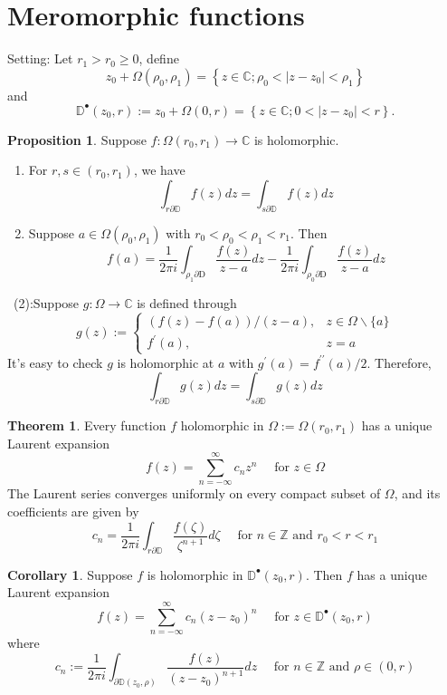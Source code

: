 \documentclass[12pt,a4paper]{book}
\newenvironment{prooff}{{\noindent\it\textcolor{cyan!40!black}{Proof}:}\,}{\par}
\newenvironment{enu}{\begin{enumerate}[(1)]}{\end{enumerate}}
\theoremstyle{definition}
\newtheorem{coro}[defn]{Corollary}
\newtheorem{theo}[defn]{Theorem}
\newtheorem{prop}[defn]{Proposition}
\begin{document}
\section{Meromorphic functions}
Setting: Let $r_1>r_0\ge 0$, define  
$$
z_0+\Omega\left(\rho_0, \rho_1\right)=\left\{z \in \mathbb{C} ; \rho_0<\left|z-z_0\right|<\rho_1\right\}
$$
and 
$$
\mathbb{D}^{\bullet}\left(z_0, r\right):=z_0+\Omega(0, r)=\left\{z \in \mathbb{C} ; 0<\left|z-z_0\right|<r\right\} .
$$

\begin{prop}
    Suppose $f: \Omega\left(r_0, r_1\right) \rightarrow \mathbb{C}$ is holomorphic.
\begin{enu} 
    \item For $r, s \in\left(r_0, r_1\right)$, we have
    $$
    \int_{r \partial \mathbb{D}} f(z) d z=\int_{s \partial \mathbb{D}} f(z) d z
    $$

    \item Suppose $a \in \Omega\left(\rho_0, \rho_1\right)$ with $r_0<\rho_0<\rho_1<r_1$. Then
    $$
    f(a)=\frac{1}{2 \pi i} \int_{\rho_1 \partial \mathrm{D}} \frac{f(z)}{z-a} d z-\frac{1}{2 \pi i} \int_{\rho_0 \partial \mathrm{D}} \frac{f(z)}{z-a} d z
    $$
\end{enu}
\end{prop}
\begin{prooff}
    (2):Suppose $g: \Omega \rightarrow \mathbb{C}$ is defined through
    $$
    g(z):=\left\{\begin{array}{cl}
    (f(z)-f(a)) /(z-a), & z \in \Omega \backslash\{a\} \\
    f^{\prime}(a), & z=a
    \end{array}\right.
    $$
    It's easy to check $g$ is holomorphic 
    at $a$ with $g^{\prime}(a)=f^{\prime \prime}(a) / 2$. Therefore, 
    $$
    \int_{r \partial \mathbb{D}} g(z) d z=\int_{s \partial \mathbb{D}} g(z) d z
    $$
\end{prooff}
\begin{theo}
    Every function $f$ holomorphic in $\Omega:=\Omega\left(r_0, r_1\right)$ has a unique Laurent expansion
    $$
    f(z)=\sum_{n=-\infty}^{\infty} c_n z^n \quad \text { for } z \in \Omega
    $$
    The Laurent series converges uniformly on every compact subset of $\Omega$, and its coefficients are given by
    $$
    c_n=\frac{1}{2 \pi i} \int_{r \partial \mathbb{D}} \frac{f(\zeta)}{\zeta^{n+1}} d \zeta \quad \text { for } n \in \mathbb{Z} \text { and } r_0<r<r_1
    $$
\end{theo}
\begin{coro}
    Suppose $f$ is holomorphic in $\mathbb{D}^{\bullet}\left(z_0, r\right)$. Then $f$ has a unique Laurent expansion
    $$
    f(z)=\sum_{n=-\infty}^{\infty} c_n\left(z-z_0\right)^n \quad \text { for } z \in \mathbb{D}^{\bullet}\left(z_0, r\right)
    $$
    where
    $$
    c_n:=\frac{1}{2 \pi i} \int_{\partial \mathbb{D}\left(z_0, \rho\right)} \frac{f(z)}{\left(z-z_0\right)^{n+1}} d z \quad \text { for } n \in \mathbb{Z} \text { and } \rho \in(0, r) 
    $$
    \label{corollary: Laurent expression}
\end{coro}
\end{document}
